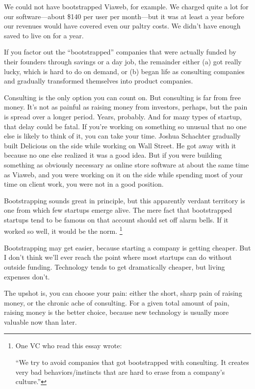 We could not have bootstrapped Viaweb, for example. We charged quite a
lot for our software---about \$140 per user per month---but it was at
least a year before our revenues would have covered even our paltry
costs. We didn't have enough saved to live on for a year.

If you factor out the ``bootstrapped'' companies that were actually
funded by their founders through savings or a day job, the remainder
either (a) got really lucky, which is hard to do on demand, or (b) began
life as consulting companies and gradually transformed themselves into
product companies.

Consulting is the only option you can count on. But consulting is far
from free money. It's not as painful as raising money from investors,
perhaps, but the pain is spread over a longer period. Years, probably.
And for many types of startup, that delay could be fatal. If you're
working on something so unusual that no one else is likely to think of
it, you can take your time. Joshua Schachter gradually built Delicious
on the side while working on Wall Street. He got away with it because no
one else realized it was a good idea. But if you were building something
as obviously necessary as online store software at about the same time
as Viaweb, and you were working on it on the side while spending most of
your time on client work, you were not in a good position.

Bootstrapping sounds great in principle, but this apparently verdant
territory is one from which few startups emerge alive. The mere fact
that bootstrapped startups tend to be famous on that account should set
off alarm bells. If it worked so well, it would be the norm.
\footnote{One VC who read this essay wrote:

``We try to avoid companies that got bootstrapped with consulting. It
creates very bad behaviors/instincts that are hard to erase from a
company's culture.''}

Bootstrapping may get easier, because starting a company is getting
cheaper. But I don't think we'll ever reach the point where most
startups can do without outside funding. Technology tends to get
dramatically cheaper, but living expenses don't.

The upshot is, you can choose your pain: either the short, sharp pain of
raising money, or the chronic ache of consulting. For a given total
amount of pain, raising money is the better choice, because new
technology is usually more valuable now than later.

